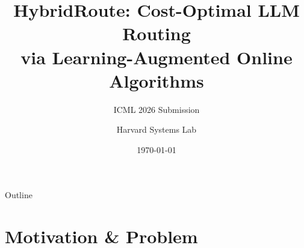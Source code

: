 \documentclass[aspectratio=169,10pt]{beamer}
\title[HybridRoute]{HybridRoute: Cost-Optimal LLM Routing\\via Learning-Augmented Online Algorithms}
\subtitle{ICML 2026 Submission}
\author{Harvard Systems Lab}
\institute{}
\date{\today}
\begin{document}
\begin{frame}
\titlepage
\end{frame}

\begin{frame}{Outline}
\tableofcontents
\end{frame}

\section{Motivation \& Problem}
\end{document}
